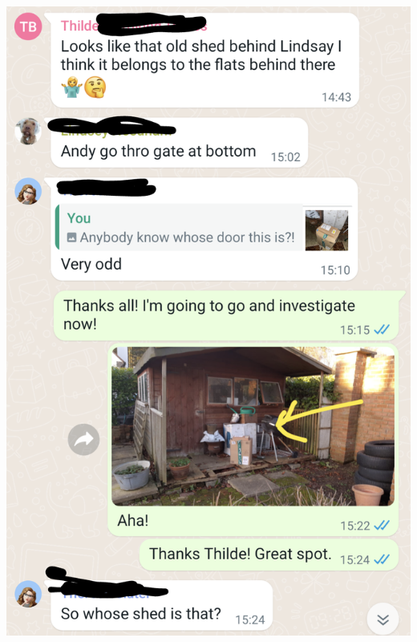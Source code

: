 \documentclass{minimal}
\begin{document}
\includegraphics[width=0.4\textheight]{Screenshot_20231012-111840.png}
\vspace*{\fill}
\pagebreak
\end{document}
